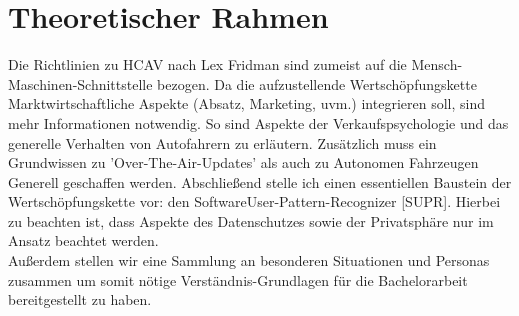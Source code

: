 \section{Theoretischer Rahmen}
Die Richtlinien zu HCAV nach Lex Fridman sind zumeist auf die Mensch-Maschinen-Schnittstelle bezogen. Da die aufzustellende Wertschöpfungskette Marktwirtschaftliche  Aspekte (Absatz, Marketing, uvm.) integrieren soll, sind mehr Informationen notwendig. So sind Aspekte der Verkaufspsychologie und das generelle Verhalten von Autofahrern zu erläutern. Zusätzlich muss ein Grundwissen zu 'Over-The-Air-Updates' als auch zu Autonomen Fahrzeugen Generell geschaffen werden. Abschließend stelle ich einen essentiellen Baustein der Wertschöpfungskette vor: den SoftwareUser-Pattern-Recognizer [SUPR]. Hierbei zu beachten ist, dass Aspekte des Datenschutzes sowie der Privatsphäre nur im Ansatz beachtet werden.\\
Außerdem stellen wir eine Sammlung an besonderen Situationen und Personas\cite{b99} zusammen um somit nötige Verständnis-Grundlagen für die Bachelorarbeit bereitgestellt zu haben.
